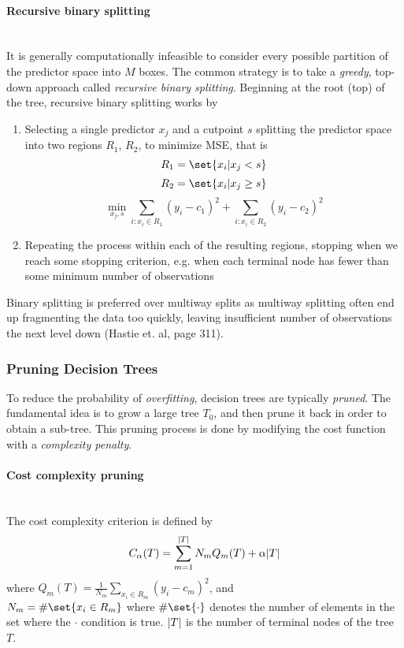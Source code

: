 \documentclass[10pt, a4paper, twocolumn]{article}
\newcommand{\myparagraph}[1]{\paragraph{#1}\mbox{}\\}
\DeclarePairedDelimiter\abs{\lvert}{\rvert}%
\DeclarePairedDelimiter\set\{\}
\begin{document}
			\myparagraph{Recursive binary splitting}
				It is generally computationally infeasible to consider every possible partition of the predictor space into $M$ boxes. The common strategy is to take a \emph{greedy}, top-down approach called \emph{recursive binary splitting}. Beginning at the root (top) of the tree, recursive binary splitting works by 
					\begin{enumerate}
						\item Selecting a single predictor $x_j$ and a cutpoint $s$ splitting the predictor space into two regions $R_1$, $R_2$, to minimize MSE, that is
							$$R_1 = \set{x_i|x_j<s}$$
							$$R_2 = \set{x_i|x_j\geq s}$$
							$$\min_{x_j, s} \sum_{i:x_i\in R_1} (y_i-c_1)^2 + \sum_{i:x_i\in R_2} (y_i-c_2)^2$$
						\item Repeating the process within each of the resulting regions, stopping when we reach some stopping criterion, e.g. when each terminal node has fewer than some minimum number of observations
					\end{enumerate}
				
				Binary splitting is preferred over multiway splits as multiway splitting often end up fragmenting the data too quickly, leaving insufficient number of observations the next level down (Hastie et. al, page 311)\cite{ElementsOfStatLearning}.
			\subsubsection{Pruning Decision Trees}
				To reduce the probability of \emph{overfitting}, decision trees are typically \emph{pruned}. The fundamental idea is to grow a large tree $T_0$, and then prune it back in order to obtain a sub-tree. This pruning process is done by modifying the cost function with a \emph{complexity penalty}.
				\myparagraph{Cost complexity pruning}
					The cost complexity criterion is defined by
						$$C_{\alpha}(T)=\sum_{m=1}^{\abs{T}}N_m Q_m(T)+\alpha\abs{T}$$
					where $Q_m (T) = \frac{1}{N_m}\sum_{x_i \in R_m}(y_i-\hat{c_m})^2$, and\\ $N_m=\#\set{x_i\in R_m}$ where $\#\set{\cdot}$ denotes the number of elements in the set where the $\cdot$ condition is true. $\abs{T}$ is the number of terminal nodes of the tree $T$.\\\\
					
\end{document}
